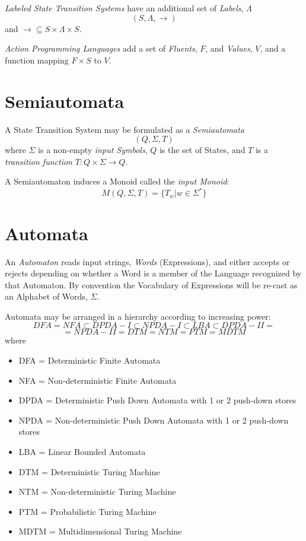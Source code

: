 \documentclass{article}
\begin{document}
\emph{Labeled State Transition Systems} have an additional set of
\emph{Labels}, $\Lambda$
\[(S,\Lambda,\rightarrow)\]
and $\rightarrow \subseteq S \times \Lambda \times S$.

\emph{Action Programming Languages} add a set of \emph{Fluents}, $F$, and
\emph{Values}, $V$, and a function mapping $F \times S$ to $V$.

\section{Semiautomata}
A State Transition System may be formulated as a \emph{Semiautomata}
\[
    (Q,\Sigma,T)
\]
where $\Sigma$ is a non-empty \emph{input Symbols}, $Q$ is the set of
States, and $T$ is a \emph{transition function} $T:Q \times \Sigma
\rightarrow Q$.

A Semiautomaton induces a Monoid called the \emph{input Monoid}:
\[
    M(Q,\Sigma,T) = \{T_w | w \in \Sigma^*\}
\]

\section{Automata} \label{subsec:automata}

An \emph{Automaton} reads input strings, \emph{Words} (Expressions),
and either accepts or rejects depending on whether a Word is a member
of the Language recognized by that Automaton. By convention the
Vocabulary of Expressions will be re-cast as an Alphabet of Words,
$\Sigma$.

Automata may be arranged in a hierarchy according to increasing power:
\[
    DFA = NFA \subset DPDA-I \subset NPDA-I \subset LBA \subset DPDA-II =
\]\[
    = NPDA-II = DTM = NTM = PTM = MDTM
\]
where
\begin{itemize}
\item DFA = Deterministic Finite Automata
\item NFA = Non-deterministic Finite Automata
\item DPDA = Deterministic Push Down Automata with 1
  or 2 push-down stores
\item NPDA = Non-deterministic Push Down Automata
  with 1 or 2 push-down stores
\item LBA = Linear Bounded Automata
\item DTM = Deterministic Turing Machine
\item NTM = Non-deterministic Turing Machine
\item PTM = Probabilistic Turing Machine
\item MDTM = Multidimensional Turing Machine
\end{itemize}
\end{document}
